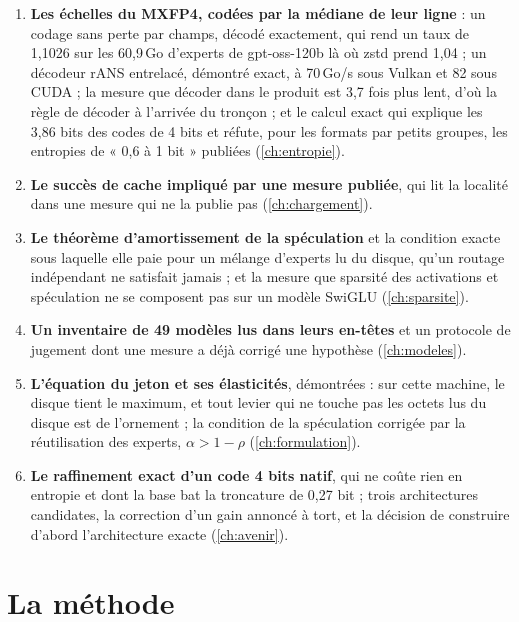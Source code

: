 \begin{enumerate}
\item \textbf{Les échelles du MXFP4, codées par la médiane de leur ligne} : un codage sans perte par champs, décodé exactement, qui rend un taux de 1,1026 sur les 60,9\,Go d'experts de gpt-oss-120b là où zstd prend 1,04 ; un décodeur rANS entrelacé, démontré exact, à 70\,Go/s sous Vulkan et 82 sous CUDA ; la mesure que décoder dans le produit est 3,7 fois plus lent, d'où la règle de décoder à l'arrivée du tronçon ; et le calcul exact qui explique les 3,86 bits des codes de 4 bits et réfute, pour les formats par petits groupes, les entropies de « 0,6 à 1 bit » publiées (\cref{ch:entropie}).
\item \textbf{Le succès de cache impliqué par une mesure publiée}, qui lit la localité dans une mesure qui ne la publie pas (\cref{ch:chargement}).
\item \textbf{Le théorème d'amortissement de la spéculation} et la condition exacte sous laquelle elle paie pour un mélange d'experts lu du disque, qu'un routage indépendant ne satisfait jamais ; et la mesure que sparsité des activations et spéculation ne se composent pas sur un modèle SwiGLU (\cref{ch:sparsite}).
\item \textbf{Un inventaire de 49 modèles lus dans leurs en-têtes} et un protocole de jugement dont une mesure a déjà corrigé une hypothèse (\cref{ch:modeles}).
\item \textbf{L'équation du jeton et ses élasticités}, démontrées : sur cette machine, le disque tient le maximum, et tout levier qui ne touche pas les octets lus du disque est de l'ornement ; la condition de la spéculation corrigée par la réutilisation des experts, $\alpha > 1 - \rho$ (\cref{ch:formulation}).
\item \textbf{Le raffinement exact d'un code 4 bits natif}, qui ne coûte rien en entropie et dont la base bat la troncature de 0,27 bit ; trois architectures candidates, la correction d'un gain annoncé à tort, et la décision de construire d'abord l'architecture exacte (\cref{ch:avenir}).
\end{enumerate}

\section{La méthode}\label{sec:methode}

